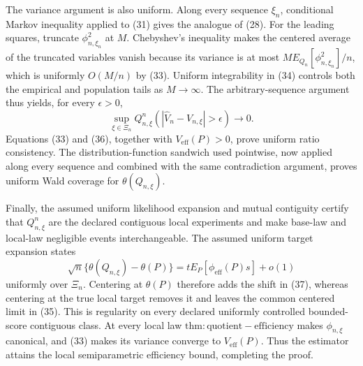 The variance argument is also uniform.  Along every sequence \(\xi_n\), conditional Markov inequality applied to (31) gives the analogue of (28).  For the leading squares, truncate \(\phi_{n,\xi_n}^2\) at \(M\).  Chebyshev's inequality makes the centered average of the truncated variables vanish because its variance is at most
\(M E_{Q_n}[\phi_{n,\xi_n}^2]/n\), which is uniformly \(O(M/n)\) by (33).  Uniform integrability in (34) controls both the empirical and population tails as \(M\to\infty\).  The arbitrary-sequence argument thus yields, for every \(\epsilon>0\),
\[
 \sup_{\xi\in\Xi_n}Q_{n,\xi}^n
 \left(\left|\widehat V_n-V_{n,\xi}\right|>\epsilon\right)
 \longrightarrow0.                                                         \tag{36}
\]
Equations (33) and (36), together with \(V_{\mathrm{eff}}(P)>0\), prove uniform ratio consistency.  The distribution-function sandwich used pointwise, now applied along every sequence and combined with the same contradiction argument, proves uniform Wald coverage for \(\theta(Q_{n,\xi})\).

Finally, the assumed uniform likelihood expansion and mutual contiguity certify that \(Q_{n,\xi}^n\) are the declared contiguous local experiments and make base-law and local-law negligible events interchangeable.  The assumed uniform target expansion states
\[
 \sqrt n\{\theta(Q_{n,\xi})-\theta(P)\}
 =tE_P[\phi_{\mathrm{eff}}(P)s]+o(1)                                      \tag{37}
\]
uniformly over \(\Xi_n\).  Centering at \(\theta(P)\) therefore adds the shift in (37), whereas centering at the true local target removes it and leaves the common centered limit in (35).  This is regularity on every declared uniformly controlled bounded-score contiguous class.  At every local law \(\mathrm{thm:quotient-efficiency}\) makes \(\phi_{n,\xi}\) canonical, and (33) makes its variance converge to \(V_{\mathrm{eff}}(P)\).  Thus the estimator attains the local semiparametric efficiency bound, completing the proof.
